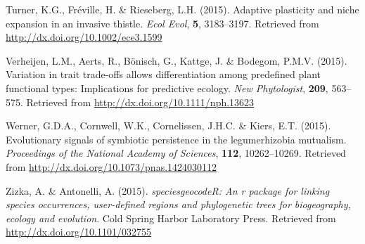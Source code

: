 \documentclass[3p]{elsarticle} %
\newlength{\cslhangindent}
\newenvironment{cslreferences}%
  {\setlength{\parindent}{0pt}%
  \everypar{\setlength{\hangindent}{\cslhangindent}}\ignorespaces}%
  {\par}
\begin{document}
\begin{cslreferences}
\leavevmode\hypertarget{ref-Turner_2015}{}%
Turner, K.G., Fréville, H. \& Rieseberg, L.H. (2015). Adaptive
plasticity and niche expansion in an invasive thistle. \emph{Ecol Evol},
\textbf{5}, 3183--3197. Retrieved from
\url{http://dx.doi.org/10.1002/ece3.1599}

\leavevmode\hypertarget{ref-Verheijen_2015}{}%
Verheijen, L.M., Aerts, R., Bönisch, G., Kattge, J. \& Bodegom, P.M.V.
(2015). Variation in trait trade-offs allows differentiation among
predefined plant functional types: Implications for predictive ecology.
\emph{New Phytologist}, \textbf{209}, 563--575. Retrieved from
\url{http://dx.doi.org/10.1111/nph.13623}

\leavevmode\hypertarget{ref-Werner_2015}{}%
Werner, G.D.A., Cornwell, W.K., Cornelissen, J.H.C. \& Kiers, E.T.
(2015). Evolutionary signals of symbiotic persistence in the
legumerhizobia mutualism. \emph{Proceedings of the National Academy of
Sciences}, \textbf{112}, 10262--10269. Retrieved from
\url{http://dx.doi.org/10.1073/pnas.1424030112}

\leavevmode\hypertarget{ref-Zizka_2015}{}%
Zizka, A. \& Antonelli, A. (2015). \emph{speciesgeocodeR: An r package
for linking species occurrences, user-defined regions and phylogenetic
trees for biogeography, ecology and evolution}. Cold Spring Harbor
Laboratory Press. Retrieved from \url{http://dx.doi.org/10.1101/032755}
\end{cslreferences}
\end{document}
